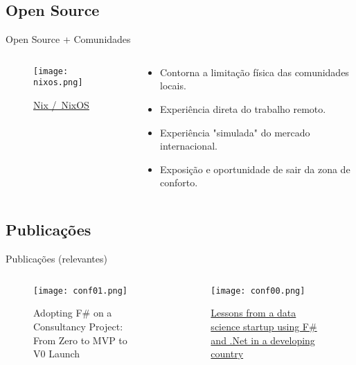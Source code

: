\documentclass{beamer}
\begin{document}
  \subsection{Open Source}
  \begin{frame}{Open Source + Comunidades}
    \begin{columns}
        \begin{column}{0.5\textwidth}
            \begin{figure}
            \centering
                \texttt{[image: nixos.png]}
                \caption{\href{https://nixos.org/}{Nix /\ NixOS}}
            \end{figure}
        \end{column}
        \begin{column}{0.5\textwidth}
            \begin{itemize}[<+->]
                \item<2-> Contorna a limitação física das comunidades locais.
                \item<3-> Experiência direta do trabalho remoto.
                \item<4-> Experiência "simulada" do mercado internacional.
                \item<5-> Exposição e oportunidade de sair da zona de conforto.
            \end{itemize}
        \end{column}
    \end{columns}

  \end{frame}

  \subsection{Publicações}
  \begin{frame}{Publicações (relevantes)}
    \begin{columns}
        \begin{column}{0.5\textwidth}
            \begin{figure}
            \centering
                \texttt{[image: conf01.png]}
                \caption{Adopting F\# on a Consultancy Project: From Zero to MVP to V0 Launch}
            \end{figure}
        \end{column}
        \begin{column}{0.5\textwidth}
            \begin{figure}
            \centering
                \texttt{[image: conf00.png]}
                \caption{\href{https://www.youtube.com/watch?v=yJDv-zdhzMY}{Lessons from a data science startup using F\# and .Net in a developing country}}
            \end{figure}
        \end{column}
    \end{columns}
  \end{frame}
\end{document}
